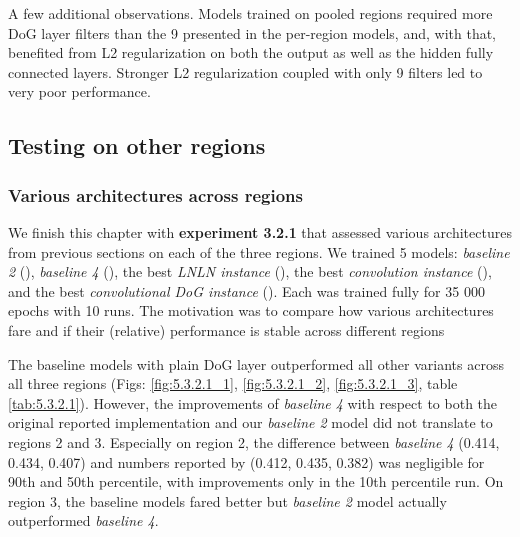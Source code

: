 A few additional observations. Models trained on pooled regions required more DoG layer filters than the 9 presented in the per-region models, and, with that, benefited from L2 regularization on both the output as well as the hidden fully connected layers. Stronger L2 regularization coupled with only 9 filters led to very poor performance. 

\subsection{Testing on other regions}\label{ch:5.3.2}
\subsubsection{Various architectures across regions}

We finish this chapter with \textbf{experiment 3.2.1} that assessed various architectures from previous sections on each of the three regions. We trained 5 models: \textit{baseline 2} (), \textit{baseline 4} (), the best \textit{LNLN instance} (), the best \textit{convolution instance} (), and the best \textit{convolutional DoG instance} (). Each was trained fully for 35 000 epochs with 10 runs. The motivation was to compare how various architectures fare and if their (relative) performance is stable across different regions

The baseline models with plain DoG layer outperformed all other variants across all three regions (Figs: \ref{fig:5.3.2.1_1}, \ref{fig:5.3.2.1_2}, \ref{fig:5.3.2.1_3}, table \ref{tab:5.3.2.1}). However, the improvements of \textit{baseline 4} with respect to both the original reported \citeauthor{antolik} implementation and our \textit{baseline 2} model did not translate to regions 2 and 3. Especially on region 2, the difference between \textit{baseline 4} (0.414, 0.434, 0.407) and numbers reported by \citeauthor{antolik} (0.412, 0.435, 0.382) was negligible for 90th and 50th percentile, with improvements only in the 10th percentile run. On region 3, the baseline models fared better but \textit{baseline 2} model actually outperformed \textit{baseline 4}.

